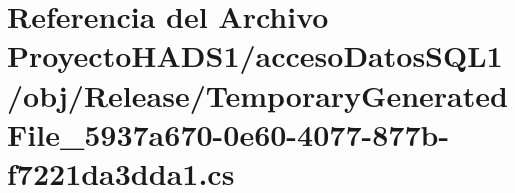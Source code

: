 \hypertarget{_proyecto_h_a_d_s1_2acceso_datos_s_q_l1_2obj_2_release_2_temporary_generated_file__5937a670-0e60-4077-877b-f7221da3dda1_8cs}{}\section{Referencia del Archivo Proyecto\+H\+A\+D\+S1/acceso\+Datos\+S\+Q\+L1/obj/\+Release/\+Temporary\+Generated\+File\+\_\+5937a670-\/0e60-\/4077-\/877b-\/f7221da3dda1.cs}
\label{_proyecto_h_a_d_s1_2acceso_datos_s_q_l1_2obj_2_release_2_temporary_generated_file__5937a670-0e60-4077-877b-f7221da3dda1_8cs}
